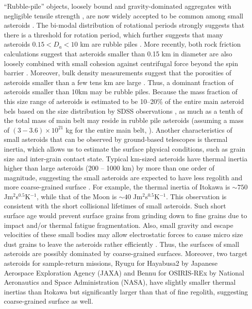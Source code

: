 \documentclass[3p,authoryear]{elsarticle}
\begin{document}
``Rubble-pile'' objects, loosely bound and gravity-dominated aggregates with negligible tensile strength \citep[e.g.][]{fujiwara1980}, are now
widely accepted to be common among small asteroids \citep[e.g.][]{richardson2002}. The bi-modal distribution of rotational periods strongly suggests
that there is a threshold for rotation period, which further suggests that many asteroids $0.15<D_a<10$ km are rubble piles \citep{pravec2002}. More recently, both rock
friction calculations suggest that asteroids smaller than 0.15 km in diameter are also loosely combined with small cohesion against
centrifugal force beyond the spin barrier \citep[e.g.][]{holsapple2007,scheeres2010,rozitis2014}. Moreover, bulk density measurements suggest that the porosities of asteroids smaller than a few tens km are large \citep{britt2002}. 
Thus, a dominant fraction of asteroids smaller than 10km may be rubble piles. Because the mass fraction of this size range of asteroids is estimated to be 10--20\% of the entire main asteroid bels based on the size distribution by SDSS observations \citep{demeo2013}, as much as a tenth of the total mass of main belt may reside in rubble pile asteroids (assuming a mass of $(3-3.6)\times 10^{21}$ kg for the entire main belt, \citep{krasinsky2002, kuchynka2013}).
Another characteristics of small asteroids that can be observed by ground-based telescopes is thermal inertia, which allows us to estimate the surface physical conditions, such as grain size and inter-grain contact state. Typical km-sized asteroids
have thermal inertia higher than large asteroids (200 -- 1000 km) by more than one order of magnitude, suggesting the small asteroids are
expected to have less regolith and more coarse-grained surface \citep{delbo2009}. For example, the thermal inertia of Itokawa is $\sim 750$ Jm$^2$s$^{0.5}$K$^{-1}$\citep{muller2005}, while that of the Moon is $\sim 40$ Jm$^2$s$^{0.5}$K$^{-1}$\citep{Keihm1984}.
This observation is consistent with the short collisional lifetimes of small asteroids. 
Such short surface age would prevent surface grains from grinding down to fine grains due to impact and/or thermal fatigue fragmentation.
Also, small gravity and escape velocities of these small bodies may allow electrostatic forces to cause micro size dust grains to leave the asteroids rather efficiently \citep{lee1996,hartzell2011,nagao2011}.
Thus, the surfaces of small asteroids are possibly dominated by coarse-grained surfaces.
Moreover, two target asteroids for sample-return missions, Ryugu for Hayabusa2 by Japanese Aerospace Exploration Agency (JAXA) and Bennu for OSIRIS-REx by National Aeronautics
and Space Administration (NASA), have slightly smaller thermal inertias \citep{hasegawa2008,emery2014, mueller2016} than Itokawa but significantly larger than
that of fine regolith, suggesting coarse-grained surface as well.
\end{document}
